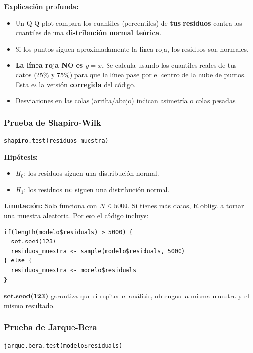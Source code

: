 \documentclass[12pt,a4paper]{article}
\begin{document}
\textbf{Explicación profunda:}
\begin{itemize}
    \item Un Q-Q plot compara los cuantiles (percentiles) de \textbf{tus residuos} contra los cuantiles de una \textbf{distribución normal teórica}.
    \item Si los puntos siguen aproximadamente la línea roja, los residuos son normales.
    \item \textbf{La línea roja NO es $y=x$.} Se calcula usando los cuantiles reales de tus datos (25\% y 75\%) para que la línea pase por el centro de la nube de puntos. Esta es la versión \textbf{corregida} del código.
    \item Desviaciones en las colas (arriba/abajo) indican asimetría o colas pesadas.
\end{itemize}

\subsubsection{Prueba de Shapiro-Wilk}

\begin{lstlisting}
shapiro.test(residuos_muestra)
\end{lstlisting}

\textbf{Hipótesis:}
\begin{itemize}
    \item $H_0$: los residuos siguen una distribución normal.
    \item $H_1$: los residuos \textbf{no} siguen una distribución normal.
\end{itemize}

\textbf{Limitación:} Solo funciona con $N \leq 5000$. Si tienes más datos, R obliga a tomar una muestra aleatoria. Por eso el código incluye:
\begin{lstlisting}
if(length(modelo$residuals) > 5000) {
  set.seed(123)
  residuos_muestra <- sample(modelo$residuals, 5000)
} else {
  residuos_muestra <- modelo$residuals
}
\end{lstlisting}

\textbf{set.seed(123)} garantiza que si repites el análisis, obtengas la misma muestra y el mismo resultado.

\subsubsection{Prueba de Jarque-Bera}

\begin{lstlisting}
jarque.bera.test(modelo$residuals)
\end{lstlisting}
\end{document}
